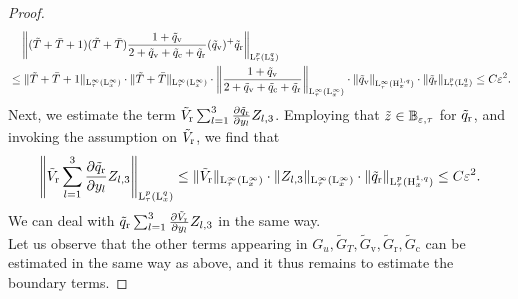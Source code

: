 \documentclass[10pt]{amsart}
\theoremstyle{plain}
\theoremstyle{definition}
\theoremstyle{thm}
\numberwithin{equation}{section}
\newcommand{\rL}{\mathrm{L}}
\newcommand{\rH}{\mathrm{H}}
\newcommand{\del}{\partial}
\newcommand{\eps}{\varepsilon}
\newcommand{\rr}{\mathrm{r}}
\newcommand{\rv}{\mathrm{v}}
\newcommand{\rc}{\mathrm{c}}
\newcommand{\tz}{\Tilde{z}}
\newcommand{\tT}{\Tilde{T}}
\newcommand{\tq}{\Tilde{q}}
\newcommand{\tV}{\Tilde{V}}
\begin{document}
\begin{proof}
 \begin{equation*}\begin{aligned}
    & \quad \left\| ( \tT + \bar{T} +1 ) (\tT +\bar{T}) \frac{1+\tq_\rv}{2 + \tq_\rv + \tq_\rc + \tq_\rr} ( \tq_\rv)^+ \tq_\rr \right\|_{\rL_\tau^{p}(\rL^{q}_x)}\\
    &\leq\|\tT + \bar{T} +1 \|_{\rL_\tau^{\infty}(\rL^{\infty}_x)} \cdot \|\tT +\bar{T}\|_{\rL_\tau^{\infty}(\rL^{\infty}_x)}\cdot \left\|\frac{1+\tq_\rv}{2 + \tq_\rv + \tq_\rc + \tq_\rr}\right\|_{\rL_\tau^{\infty}(\rL^{\infty}_x)}\cdot \|\tq_\rv\|_{\rL_\tau^{\infty}(\rH^{1,q}_x)} \cdot \|\tq_\rr\|_{\rL_\tau^{p}(\rL^{q}_x)} \le C\eps^2.
 \end{aligned}
 \end{equation*}
Next, we estimate the term $\tV_\rr\sum_{l=1}^3 \frac{\del \tq_\rr}{\del y_{l}}Z_{l,3}
        $. 
Employing that $\tz \in \mathbb{B_{\eps,\tau}}$ for $\tq_\rr$, and invoking the assumption on $\tV_\rr$, we find that 
 \begin{equation*}
     \left\|\tV_\rr\sum_{l=1}^3 \frac{\del \tq_\rr}{\del y_{l}}Z_{l,3}\right\|_{\rL_\tau^{p}(\rL^{q}_x)}\leq\| \tV_\rr\|_{\rL_\tau^{\infty}(\rL^{\infty}_x)}\cdot \|Z_{l,3}\|_{\rL_\tau^{\infty}(\rL^{\infty}_x)}\cdot\|\tq_\rr\|_{\rL_\tau^{p}(\rH^{1,q}_x)}\leq C\eps^{2}.
\end{equation*}
We can deal with $\tq_\rr\sum_{l=1}^3 \frac{\del \tV_\rr}{\del y_{l}} Z_{l,3}$ in the same way.\\
Let us observe that the other terms appearing in $G_u,\tilde{G}_T, \tilde{G}_\rv, \tilde{G}_\rr, \tilde{G}_\rc$ can be estimated in the same way as above, and it thus remains to estimate the boundary terms.


\end{proof}
\end{document}
